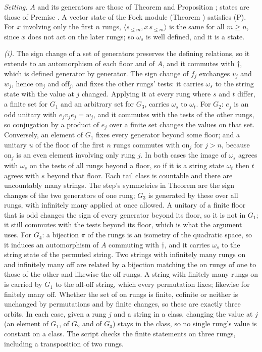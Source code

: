 \emph{Setting.} $A$ and its generators are those of Theorem  and Proposition ; states are those of Premise . A vector state of the Fock module (Theorem ) satisfies (P). For $x$ involving only the first $n$ rungs, $\langle s_{\le m}, x\,s_{\le m}\rangle$ is the same for all $m \ge n$, since $x$ does not act on the later rungs; so $\omega_{s}$ is well defined, and it is a state.

\emph{(i).} The sign change of a set of generators preserves the defining relations, so it extends to an automorphism of each floor and of $A$, and it commutes with $\dagger$, which is defined generator by generator. The sign change of $f_{j}$ exchanges $v_{j}$ and $w_{j}$, hence $\mathrm{on}_{j}$ and $\mathrm{off}_{j}$, and fixes the other rungs' tests: it carries $\omega_{s}$ to the string state with the value at $j$ changed. Applying it at every rung where $s$ and $t$ differ, a finite set for $G_{1}$ and an arbitrary set for $G_{3}$, carries $\omega_{s}$ to $\omega_{t}$. For $G_{2}$: $e_{j}$ is an odd unitary with $e_{j}v_{j}e_{j} = w_{j}$, and it commutes with the tests of the other rungs, so conjugation by a product of $e_{j}$ over a finite set changes the values on that set. Conversely, an element of $G_{1}$ fixes every generator beyond some floor; and a unitary $u$ of the floor of the first $n$ rungs commutes with $\mathrm{on}_{j}$ for $j > n$, because $\mathrm{on}_{j}$ is an even element involving only rung $j$. In both cases the image of $\omega_{s}$ agrees with $\omega_{s}$ on the tests of all rungs beyond a floor, so if it is a string state $\omega_{t}$ then $t$ agrees with $s$ beyond that floor. Each tail class is countable and there are uncountably many strings. The step's symmetries in Theorem  are the sign changes of the two generators of one rung; $G_{3}$ is generated by these over all rungs, with infinitely many applied at once allowed. A unitary of a finite floor that is odd changes the sign of every generator beyond its floor, so it is not in $G_{1}$; it still commutes with the tests beyond its floor, which is what the argument uses. For $G_{4}$: a bijection $\pi$ of the rungs is an isometry of the quadratic space, so it induces an automorphism of $A$ commuting with $\dagger$, and it carries $\omega_{s}$ to the string state of the permuted string. Two strings with infinitely many rungs on and infinitely many off are related by a bijection matching the on rungs of one to those of the other and likewise the off rungs. A string with finitely many rungs on is carried by $G_{1}$ to the all-off string, which every permutation fixes; likewise for finitely many off. Whether the set of on rungs is finite, cofinite or neither is unchanged by permutations and by finite changes, so these are exactly three orbits. In each case, given a rung $j$ and a string in a class, changing the value at $j$ (an element of $G_{1}$, of $G_{2}$ and of $G_{3}$) stays in the class, so no single rung's value is constant on a class. The script checks the finite statements on three rungs, including a transposition of two rungs.

